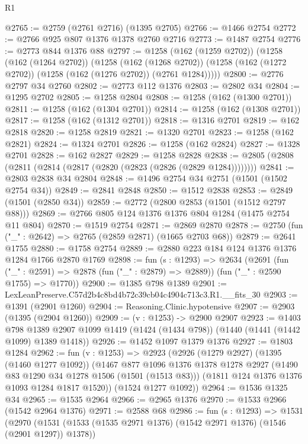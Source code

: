 \begin{lexlean}{R1}
\begin{coremodule}
@2765 := @2759 (@2761 @2716) (@1395 @2705)
@2766 := @1466 @2754
@2772 := @2766 @925 @807 @1376 @1378 @2760 @2716
@2773 := @1487 @2754
@2776 := @2773 @844 @1376 @88
@2797 := @1258
    (@162 (@1259 @2702))
    (@1258
      (@162 (@1264 @2702))
      (@1258
        (@162 (@1268 @2702))
        (@1258 (@162 (@1272 @2702)) (@1258 (@162 (@1276 @2702)) (@2761 @1284)))))
@2800 := @2776 @2797 @34 @2760
@2802 := @2773 @112 @1376
@2803 := @2802 @34
@2804 := @1295 @2702
@2805 := @1258 @2804
@2808 := @1258 (@162 (@1300 @2701))
@2811 := @1258 (@162 (@1304 @2701))
@2814 := @1258 (@162 (@1308 @2701))
@2817 := @1258 (@162 (@1312 @2701))
@2818 := @1316 @2701
@2819 := @162 @2818
@2820 := @1258 @2819
@2821 := @1320 @2701
@2823 := @1258 (@162 @2821)
@2824 := @1324 @2701
@2826 := @1258 (@162 @2824)
@2827 := @1328 @2701
@2828 := @162 @2827
@2829 := @1258 @2828
@2838 := @2805 (@2808 (@2811 (@2814 (@2817 (@2820 (@2823 (@2826 (@2829 @1284))))))))
@2841 := @2803 @2838 @34 @2804
@2848 := @1496 @2754 @34 @2751 (@1501 (@1502 @2754 @34))
@2849 := @2841 @2848
@2850 := @1512 @2838
@2853 := @2849 (@1501 (@2850 @34))
@2859 := @2772 (@2800 @2853 (@1501 (@1512 @2797 @88)))
@2869 := @2766 @805 @124 @1376 @1376 @804 @1284 (@1475 @2754 @11 @804)
@2870 := @1519 @2754
@2871 := @2869 @2870
@2878 := @2750 (fun ("_" : @2642) => @2765 (@2859 @2871) (@1665 @2703 @68))
@2879 := @2641 @1755
@2880 := @1758 @2754
@2889 := @2880 @223 @184 @124 @1376 @1376 @1284 @1766 @2870 @1769
@2898 := fun (s : @1293) =>
  @2634
    (@2691
      (fun ("_" : @2591) => @2878 (fun ("_" : @2879) => @2889))
      (fun ("_" : @2590 @1755) => @1770))
@2900 := @1385 @798 @1389
@2901 := LexLeanPreserve.C57d2b4c8bd4b72c39cb04c4904c713c3.R1.__fits_30
@2903 := @1391 (@2901 @1260)
@2904 := Reasoning.Clinic.hypotensive
@2907 := @2903 (@1395 (@2904 @1260))
@2909 := (v : @1253) -> @2900 @2907
@2923 := @1403
    @798
    @1389
    @2907
    @1099
    @1419
    (@1424 (@1434 @798))
    (@1440 (@1441 (@1442 @1099) @1389 @1418))
@2926 := @1452 @1097 @1379 @1376
@2927 := @1803 @1284
@2962 := fun (v : @1253) =>
  @2923
    (@2926
      (@1279 @2927)
      (@1395 (@1460 @1277 @1092))
      (@1467
        @877
        @1096
        @1376
        @1378
        @1278
        @2927
        (@1490 @83 @1290 @34 @1278 @1506 (@1501 (@1513 @83)))
        (@1811 @124 @1376 @1376 @1093 @1284 @1817 @1520))
      (@1524 @1277 @1092))
@2964 := @1536 @1325 @34
@2965 := @1535 @2964
@2966 := @2965 @1376
@2970 := @1533 @2966 (@1542 @2964 @1376)
@2971 := @2588 @68
@2986 := fun (s : @1293) =>
  @1531
    (@2970
      (@1531 (@1533 (@1535 @2971 @1376) (@1542 @2971 @1376) (@1546 (@2901 @1297)) @1378))

\end{coremodule}
\end{lexlean}
